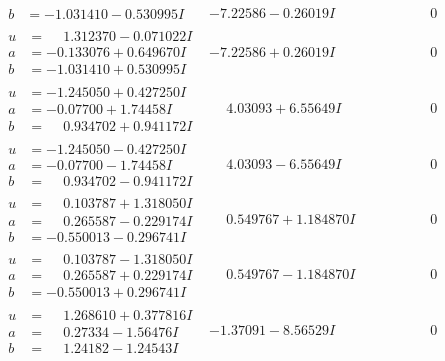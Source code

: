 \documentclass[1p]{elsarticle_modified}
\theoremstyle{definition}
\begin{document}
$$\begin{array}{c|c|c}
\begin{aligned}
b &= -1.031410 - 0.530995 I\end{aligned}
 & -7.22586 - 0.26019 I & \phantom{-0.000000 } 0 \\ \hline\begin{aligned}
u &= \phantom{-}1.312370 - 0.071022 I \\
a &= -0.133076 + 0.649670 I \\
b &= -1.031410 + 0.530995 I\end{aligned}
 & -7.22586 + 0.26019 I & \phantom{-0.000000 } 0 \\ \hline\begin{aligned}
u &= -1.245050 + 0.427250 I \\
a &= -0.07700 + 1.74458 I \\
b &= \phantom{-}0.934702 + 0.941172 I\end{aligned}
 & \phantom{-}4.03093 + 6.55649 I & \phantom{-0.000000 } 0 \\ \hline\begin{aligned}
u &= -1.245050 - 0.427250 I \\
a &= -0.07700 - 1.74458 I \\
b &= \phantom{-}0.934702 - 0.941172 I\end{aligned}
 & \phantom{-}4.03093 - 6.55649 I & \phantom{-0.000000 } 0 \\ \hline\begin{aligned}
u &= \phantom{-}0.103787 + 1.318050 I \\
a &= \phantom{-}0.265587 - 0.229174 I \\
b &= -0.550013 - 0.296741 I\end{aligned}
 & \phantom{-}0.549767 + 1.184870 I & \phantom{-0.000000 } 0 \\ \hline\begin{aligned}
u &= \phantom{-}0.103787 - 1.318050 I \\
a &= \phantom{-}0.265587 + 0.229174 I \\
b &= -0.550013 + 0.296741 I\end{aligned}
 & \phantom{-}0.549767 - 1.184870 I & \phantom{-0.000000 } 0 \\ \hline\begin{aligned}
u &= \phantom{-}1.268610 + 0.377816 I \\
a &= \phantom{-}0.27334 - 1.56476 I \\
b &= \phantom{-}1.24182 - 1.24543 I\end{aligned}
 & -1.37091 - 8.56529 I & \phantom{-0.000000 } 0 \\ \hline\begin{aligned}

\end{aligned}
\end{array}$$
\end{document}
